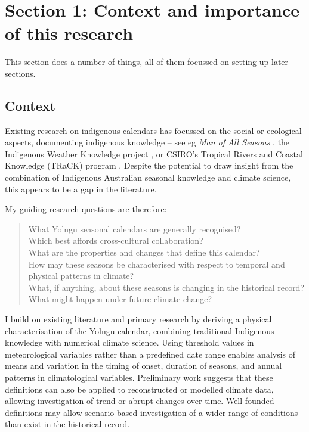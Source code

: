 \chapter{Section 1: Context and importance of this research}
This section does a number of things, all of them focussed on setting up later sections.

\section{Context}

Existing research on indigenous calendars has focussed on the social or ecological aspects, documenting indigenous knowledge –
see eg \textit{Man of All Seasons} \citep{davis1989}, the Indigenous Weather Knowledge project \citet{BOM-iwk}, or
CSIRO’s Tropical Rivers and Coastal Knowledge (TRaCK) program \citep{CSIROcals,oconnor2010}.
Despite the potential to draw insight from the combination of Indigenous Australian seasonal knowledge and climate science, this appears to be a gap in the literature.

My guiding research questions are therefore:
\blockquote{
What Yolngu seasonal calendars are generally recognised?\\
Which best affords cross-cultural collaboration?\\
What are the properties and changes that define this calendar?\\
How may these seasons be characterised with respect to temporal and physical patterns in climate?\\
What, if anything, about these seasons is changing in the historical record?\\
What might happen under future climate change?\\
}

I build on existing literature and primary research by deriving a physical characterisation of the Yolngu calendar,
combining traditional Indigenous knowledge with numerical climate science.
Using threshold values in meteorological variables rather than a predefined date range enables
analysis of means and variation in the timing of onset, duration of seasons, and annual patterns in climatological variables.
Preliminary work suggests that these definitions can also be applied to reconstructed or modelled climate data,
allowing investigation of trend or abrupt changes over time.
Well-founded definitions may allow scenario-based investigation of a wider range of conditions than exist in the historical record.


